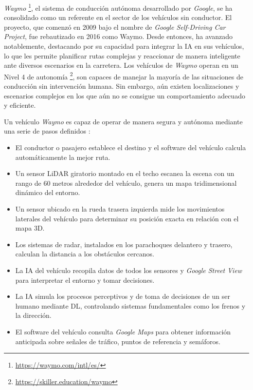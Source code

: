 \textit{Waymo} \footnote{\url{https://waymo.com/intl/es/}}, el sistema de conducción autónoma desarrollado por \textit{ Google}, se ha consolidado como un referente en el sector de los vehículos sin conductor. El proyecto, que comenzó en 2009 bajo el nombre de \textit{Google Self-Driving Car Project}, fue rebautizado en 2016 como {Waymo}. Desde entonces, ha avanzado notablemente, destacando por su capacidad para integrar la \ac{IA} en sus vehículos, lo que les permite planificar rutas complejas y reaccionar de manera inteligente ante diversos escenarios en la carretera. Los vehículos de \textit{Waymo} operan en un Nivel 4 de autonomía \footnote{\url {https://skiller.education/waymo}}, son capaces de manejar la mayoría de las situaciones de conducción sin intervención humana. Sin embargo, aún existen localizaciones y escenarios complejos en los que aún no se consigue un comportamiento adecuado y eficiente.

Un vehículo \textit{Waymo} es capaz de operar de manera segura y autónoma mediante una serie de pasos definidos \cite{ai-self-driving-cars}:

\begin{itemize}
\item El conductor o pasajero establece el destino y el software del vehículo calcula automáticamente la mejor ruta.
\item Un sensor \ac{LiDAR} giratorio montado en el techo escanea la escena con un rango de 60 metros alrededor del vehículo, genera un mapa tridimensional dinámico del entorno.
\item Un sensor ubicado en la rueda trasera izquierda mide los movimientos laterales del vehículo para determinar su posición exacta en relación con el mapa 3D.
\item Los sistemas de radar, instalados en los parachoques delantero y trasero, calculan la distancia a los obstáculos cercanos.
\item La \ac{IA} del vehículo recopila datos de todos los sensores y \textit{Google Street View} para interpretar el entorno y tomar decisiones.
\item La \ac{IA} simula los procesos perceptivos y de toma de decisiones de un ser humano mediante \ac{DL}, controlando sistemas fundamentales como los frenos y la dirección.
\item El software del vehículo consulta \textit{Google Maps} para obtener información anticipada sobre señales de tráfico, puntos de referencia y semáforos.
\end{itemize}

